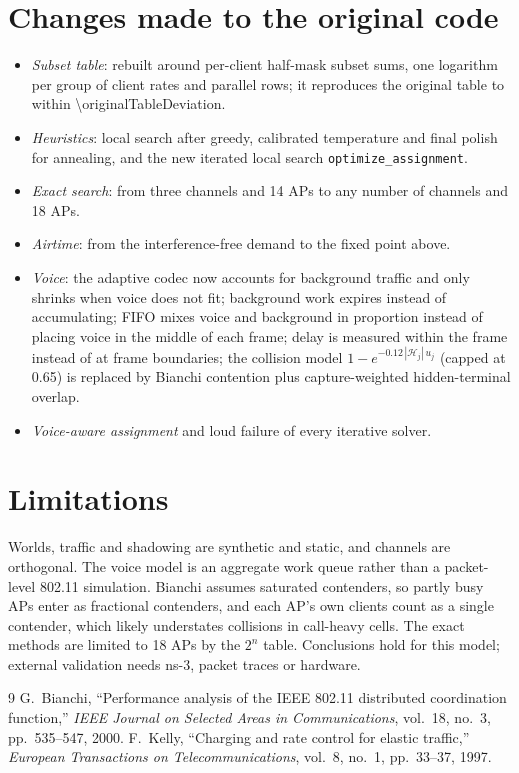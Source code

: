 \documentclass[10pt]{article}
\newcommand{\code}[1]{\texttt{#1}}
\begin{document}
\section{Changes made to the original code}

\begin{itemize}
\item \emph{Subset table}: rebuilt around per-client half-mask subset sums, one logarithm per group of client rates and
  parallel rows; it reproduces the original table to within \num{\originalTableDeviation}.
\item \emph{Heuristics}: local search after greedy, calibrated temperature and final polish for annealing, and the new
  iterated local search \code{optimize\_assignment}.
\item \emph{Exact search}: from three channels and 14 APs to any number of channels and 18 APs.
\item \emph{Airtime}: from the interference-free demand to the fixed point above.
\item \emph{Voice}: the adaptive codec now accounts for background traffic and only shrinks when voice does not fit;
  background work expires instead of accumulating; FIFO mixes voice and background in proportion instead of placing voice
  in the middle of each frame; delay is measured within the frame instead of at frame boundaries; the collision model
  $1 - e^{-0.12\,|\mathcal H_j|\,u_j}$ (capped at 0.65) is replaced by Bianchi contention plus capture-weighted
  hidden-terminal overlap.
\item \emph{Voice-aware assignment} and loud failure of every iterative solver.
\end{itemize}

\section{Limitations}
Worlds, traffic and shadowing are synthetic and static, and channels are orthogonal. The voice model is an aggregate work
queue rather than a packet-level 802.11 simulation. Bianchi assumes saturated contenders, so partly busy APs enter as
fractional contenders, and each AP's own clients count as a single contender, which likely understates collisions in
call-heavy cells. The exact methods are limited to 18 APs by the $2^n$ table. Conclusions hold for this model; external
validation needs ns-3, packet traces or hardware.

\begin{thebibliography}{9}
 G.~Bianchi, ``Performance analysis of the IEEE 802.11 distributed coordination function,''
  \emph{IEEE Journal on Selected Areas in Communications}, vol.~18, no.~3, pp.~535--547, 2000.
 F.~Kelly, ``Charging and rate control for elastic traffic,''
  \emph{European Transactions on Telecommunications}, vol.~8, no.~1, pp.~33--37, 1997.
\end{thebibliography}
\end{document}
